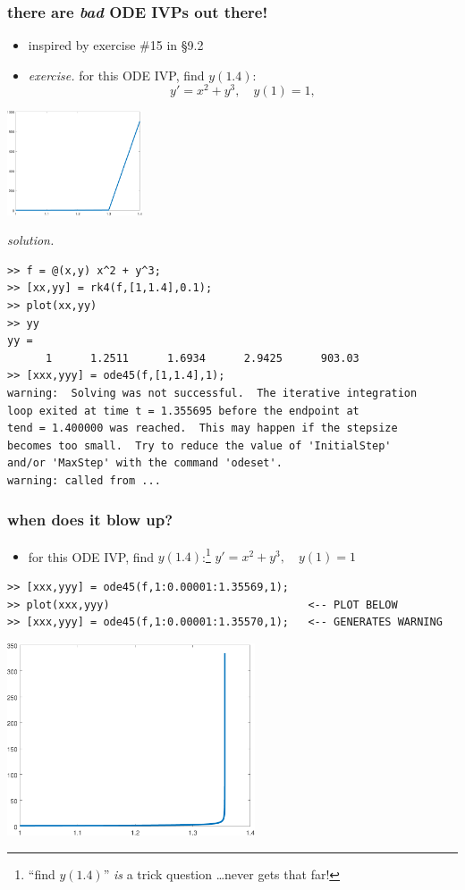 \documentclass[urlcolor=blue,dvipsnames]{beamer}
\begin{document}
\begin{frame}[fragile]
\frametitle{there are \emph{bad} ODE IVPs out there!}

\begin{itemize}
\item inspired by exercise \#15 in \S9.2
\item \emph{exercise.}  for this ODE IVP, find $y(1.4)$:
    $$y' = x^2 + y^3, \quad y(1)=1,$$
\end{itemize}

\hfill \includegraphics[width=0.3\textwidth]{figs/blowuprk4}

\vspace{-20mm}
\noindent \emph{solution.}
\begin{Verbatim}[fontsize=\footnotesize]
>> f = @(x,y) x^2 + y^3;
>> [xx,yy] = rk4(f,[1,1.4],0.1);
>> plot(xx,yy)
>> yy
yy =
      1      1.2511      1.6934      2.9425      903.03
>> [xxx,yyy] = ode45(f,[1,1.4],1);
warning:  Solving was not successful.  The iterative integration
loop exited at time t = 1.355695 before the endpoint at
tend = 1.400000 was reached.  This may happen if the stepsize
becomes too small.  Try to reduce the value of 'InitialStep'
and/or 'MaxStep' with the command 'odeset'.
warning: called from ...
\end{Verbatim}

\end{frame}


\begin{frame}[fragile]
\frametitle{when does it blow up?}

\begin{itemize}
\item for this ODE IVP, find $y(1.4)$:\footnote{``find $y(1.4)$'' \emph{is} a trick question \dots never gets that far!} \quad $y' = x^2 + y^3, \quad y(1)=1$
\end{itemize}

\begin{Verbatim}[fontsize=\footnotesize]
>> [xxx,yyy] = ode45(f,1:0.00001:1.35569,1);
>> plot(xxx,yyy)                               <-- PLOT BELOW
>> [xxx,yyy] = ode45(f,1:0.00001:1.35570,1);   <-- GENERATES WARNING
\end{Verbatim}

\hfill \includegraphics[width=0.55\textwidth]{figs/blowupode45}
\end{frame}
\end{document}
